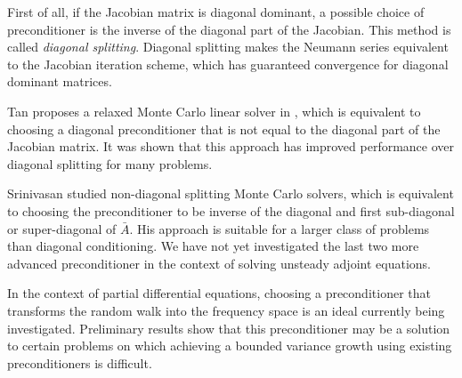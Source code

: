 \documentclass{elsart}
\theoremstyle{remark}
\theoremstyle{definition}
\theoremstyle{proof}
\begin{document}
        First of all, if the Jacobian matrix is diagonal dominant, a possible
        choice of preconditioner is the inverse of the diagonal part of the
        Jacobian. This method is called \emph{diagonal splitting}.  Diagonal
        splitting makes the Neumann series equivalent to the Jacobian
        iteration scheme, which has guaranteed convergence for diagonal
        dominant matrices.
        
        Tan proposes a relaxed Monte Carlo linear solver in \cite{Tan2001}
        \cite{Tan2002}, which is equivalent to choosing a diagonal
        preconditioner that is not equal to the diagonal part of the Jacobian
        matrix.  It was shown that this approach has improved performance
        over diagonal splitting for many problems.
        
        Srinivasan \cite{Srinivasan2003} studied non-diagonal splitting
        Monte Carlo solvers, which is equivalent to choosing the preconditioner
        to be inverse of the diagonal and first sub-diagonal or super-diagonal
        of $\bar{A}$.  His approach is suitable for a larger class of problems
        than diagonal conditioning.  We have not yet investigated the last two
        more advanced preconditioner in the context of solving unsteady adjoint
        equations.

        In the context of partial differential equations, choosing a
        preconditioner that transforms the random walk into the frequency
        space is an ideal currently being investigated.  Preliminary results
        show that this preconditioner may be a solution to certain problems
        on which achieving a bounded variance growth using existing
        preconditioners is difficult.
    
\end{document}
